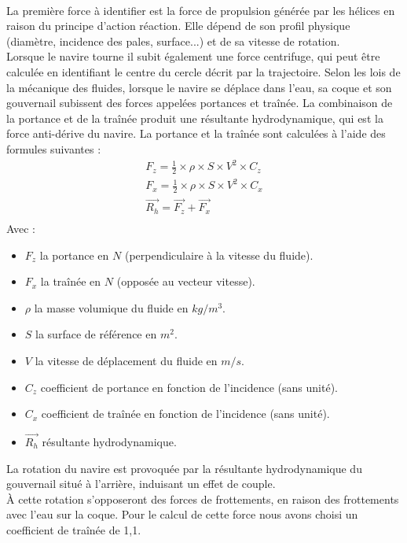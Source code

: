 \documentclass[a4paper,11pt]{article}
\begin{document}
    \paragraph{}
    La première force à identifier est la force de propulsion générée par les hélices en raison du principe d'action réaction. Elle dépend de son profil physique  (diamètre, incidence des pales, surface...) et de sa vitesse de rotation.\\
    Lorsque le navire tourne il subit également une force centrifuge, qui peut être calculée en identifiant le centre du cercle décrit par la trajectoire.
    Selon les lois de la mécanique des fluides, lorsque le navire se déplace dans l’eau, sa coque et son gouvernail subissent des forces appelées portances et traînée. La combinaison de la portance et de la traînée produit une résultante hydrodynamique, qui est la force anti-dérive du navire.
    La portance et la traînée sont calculées à l’aide des formules suivantes :\\
    \begin{gather*}
        F_{z} = \frac{1}{2} \times \rho \times S \times V^{2} \times C_{z}\\
        F_{x} = \frac{1}{2} \times \rho \times S \times V^{2} \times C_{x}\\
        \overrightarrow{R_{h}} = \overrightarrow{F_{z}} + \overrightarrow{F_{x}}\\
    \end{gather*}
    Avec :
    \begin{itemize}
        \item $F_{z}$ la portance en $N$ (perpendiculaire à la vitesse du fluide).
        \item $F_{x}$ la traînée en $N$ (opposée au vecteur vitesse).
        \item $\rho$ la masse volumique du fluide en $kg/m^{3}$.
        \item $S$ la surface de référence en $m^{2}$.
        \item $V$ la vitesse de déplacement du fluide en $m/s$.
        \item $C_{z}$ coefficient de portance en fonction de l'incidence (sans unité).
        \item $C_{x}$ coefficient de traînée en fonction de l'incidence (sans unité).
        \item $\overrightarrow{R_{h}}$ résultante hydrodynamique.
    \end{itemize}
    \vspace*{0.3cm}
    La rotation du navire est provoquée par la résultante hydrodynamique du gouvernail situé à l’arrière, induisant un effet de couple.\\
    À cette rotation s'opposeront des forces de frottements, en raison des frottements avec l'eau sur la coque. Pour le calcul de cette force nous avons choisi un coefficient de traînée de 1,1.
\end{document}
